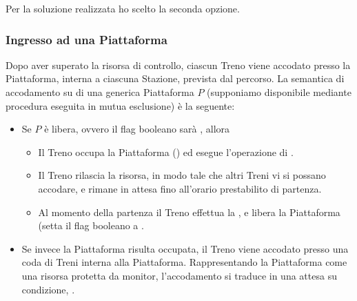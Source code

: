 		Per la soluzione realizzata ho scelto la seconda opzione.
		
		\subsubsection{Ingresso ad una Piattaforma}
		
		Dopo aver superato la risorsa di controllo, ciascun Treno viene accodato presso la Piattaforma, interna a ciascuna Stazione, prevista dal percorso. La semantica di accodamento su di una generica Piattaforma $P$ (supponiamo disponibile mediante procedura eseguita in mutua esclusione) è la seguente:
		\begin{itemize}
			\item Se $P$ è libera, ovvero il flag booleano  sarà , allora 
				\begin{itemize}
					\item Il Treno occupa la Piattaforma () ed esegue l'operazione di .
					\item Il Treno rilascia la risorsa, in modo tale che altri Treni vi si possano accodare, e rimane in attesa fino all'orario prestabilito di partenza.
					\item Al momento della partenza il Treno effettua la , e libera la Piattaforma (setta il flag booleano  a .
				\end{itemize} 
			\item Se invece la Piattaforma risulta occupata, il Treno viene accodato presso una coda di Treni interna alla Piattaforma. Rappresentando la Piattaforma come una risorsa protetta da monitor, l'accodamento si traduce in una attesa su condizione, .
		\end{itemize}
		
		
		
		
